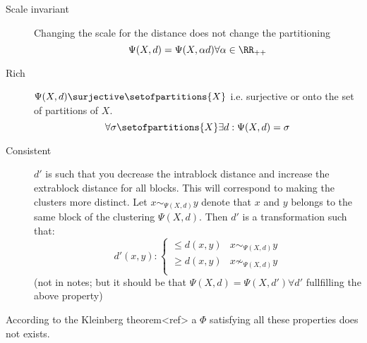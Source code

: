 \begin{description}
    \item[Scale invariant]
        Changing the scale for the distance does not change the partitioning
        \begin{equation}
            \Psi(X, d) = \Psi(X, \alpha d) \forall \alpha\in \RR_{++}
        \end{equation}
    \item[Rich]
        $\Psi(X, d)\surjective\setofpartitions{X}$ i.e. surjective or onto the
        set of partitions of $X$.
        \begin{equation}
            \forall \sigma\setofpartitions{X} \exists d : \Psi(X, d)=\sigma
        \end{equation}
    \item[Consistent]
        $d'$ is such that you decrease the intrablock distance and increase the
        extrablock distance for all blocks. This will correspond to making the
        clusters more distinct. Let $x \sim_{\Psi(X, d)} y$ denote that $x$ and
        $y$ belongs to the same block of the clustering $\Psi(X, d)$. Then $d'$
        is a transformation such that:
        \begin{equation}
            d'(x, y) : \begin{cases}
                \le d(x, y) & x\sim_{\Psi(X, d)} y\\
                \ge d(x, y) & x\not\sim_{\Psi(X, d)} y\\
            \end{cases}
        \end{equation}
        (not in notes; but it should be that $\Psi(X, d)=\Psi(X, d')\forall d'$
        fullfilling the above property)
\end{description}


According to the Kleinberg theorem<ref> a $\Phi$ satisfying all these properties
does not exists.

